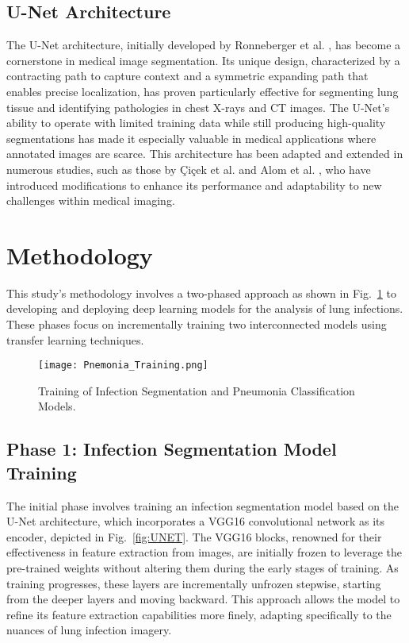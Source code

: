 \documentclass[10pt]{article}
\begin{document}
\subsection{U-Net Architecture}
The U-Net architecture, initially developed by Ronneberger et al. \cite{Ronneberger2015}, has become a cornerstone in medical image segmentation. Its unique design, characterized by a contracting path to capture context and a symmetric expanding path that enables precise localization, has proven particularly effective for segmenting lung tissue and identifying pathologies in chest X-rays and CT images. The U-Net's ability to operate with limited training data while still producing high-quality segmentations has made it especially valuable in medical applications where annotated images are scarce. This architecture has been adapted and extended in numerous studies, such as those by Çiçek et al. \cite{Cicek2016} and Alom et al. \cite{Alom2018}, who have introduced modifications to enhance its performance and adaptability to new challenges within medical imaging.


\section{Methodology}

This study's methodology involves a two-phased approach as shown in Fig.~\ref{fig:Training} to developing and deploying deep learning models for the analysis of lung infections. These phases focus on incrementally training two interconnected models using transfer learning techniques.

\begin{figure}[!htbp]
    \centering
    \texttt{[image: Pnemonia\_Training.png]}
    \caption{Training of Infection Segmentation and Pneumonia Classification Models.}
    \label{fig:Training}
\end{figure}

\subsection{Phase 1: Infection Segmentation Model Training}
The initial phase involves training an infection segmentation model based on the U-Net architecture, which incorporates a VGG16 convolutional network as its encoder, depicted in Fig.~\ref{fig:UNET}. The VGG16 blocks, renowned for their effectiveness in feature extraction from images, are initially frozen to leverage the pre-trained weights without altering them during the early stages of training. As training progresses, these layers are incrementally unfrozen stepwise, starting from the deeper layers and moving backward. This approach allows the model to refine its feature extraction capabilities more finely, adapting specifically to the nuances of lung infection imagery.
\end{document}
